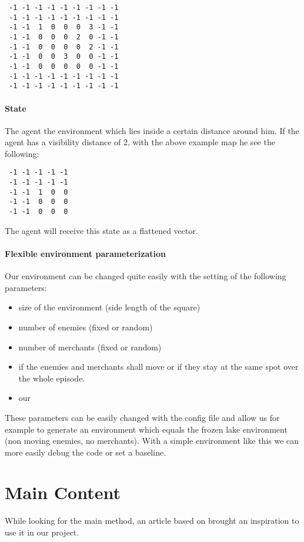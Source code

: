 \documentclass[a4paper,11pt]{article}
\theoremstyle{definition}
\begin{document}
\begin{verbatim}
 -1 -1 -1 -1 -1 -1 -1 -1 -1
 -1 -1 -1 -1 -1 -1 -1 -1 -1
 -1 -1  1  0  0  0  3 -1 -1
 -1 -1  0  0  0  2  0 -1 -1
 -1 -1  0  0  0  0  2 -1 -1
 -1 -1  0  0  3  0  0 -1 -1
 -1 -1  0  0  0  0  0 -1 -1
 -1 -1 -1 -1 -1 -1 -1 -1 -1
 -1 -1 -1 -1 -1 -1 -1 -1 -1
\end{verbatim}

\paragraph{State}
\label{sec:state}
The agent  the environment which lies inside a certain distance around him. If the agent has a visibility distance of 2, with the above example map he see the following:
 \begin{verbatim}
 -1 -1 -1 -1 -1 
 -1 -1 -1 -1 -1 
 -1 -1  1  0  0 
 -1 -1  0  0  0  
 -1 -1  0  0  0 
\end{verbatim}
The agent will receive this state as a flattened vector.

\paragraph{Flexible environment parameterization} 
Our environment can be changed quite easily with the setting of the following parameters:
\begin{itemize}
	\item size of the environment (side length of the square) 
	\item number of enemies (fixed or random)
	\item number of merchants (fixed or random)
	\item if the enemies and merchants shall move or if they stay at the same spot over the whole episode.
	\item our 
\end{itemize}
These parameters can be easily changed with the config file and allow us for example to generate an environment which equals the frozen lake environment (non moving enemies, no merchants). With a simple environment like this we can more easily debug the code or set a baseline.


\section{Main Content}
While looking for the main method, an article \cite{crabe_2020} based on \cite{schaul_2016} brought an inspiration to use it in our project. 
\end{document}
